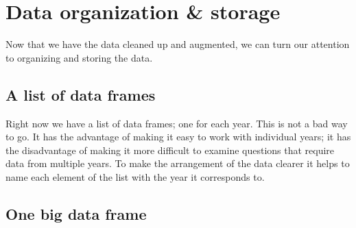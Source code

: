 \documentclass[
]{book}
\newenvironment{Shaded}{\begin{snugshade}}{\end{snugshade}}
\newcommand{\CommentTok}[1]{\textcolor[rgb]{0.56,0.35,0.01}{\textit{#1}}}
\newcommand{\DataTypeTok}[1]{\textcolor[rgb]{0.13,0.29,0.53}{#1}}
\newcommand{\KeywordTok}[1]{\textcolor[rgb]{0.13,0.29,0.53}{\textbf{#1}}}
\newcommand{\NormalTok}[1]{#1}
\newcommand{\OperatorTok}[1]{\textcolor[rgb]{0.81,0.36,0.00}{\textbf{#1}}}
\newcommand{\StringTok}[1]{\textcolor[rgb]{0.31,0.60,0.02}{#1}}
\begin{document}
\hypertarget{data-organization-storage}{%
\section{Data organization \& storage}\label{data-organization-storage}}

Now that we have the data cleaned up and augmented, we can turn our attention to organizing and storing the data.

\hypertarget{a-list-of-data-frames}{%
\subsection{A list of data frames}\label{a-list-of-data-frames}}

Right now we have a list of data frames; one for each year. This is not a bad way to go. It has the advantage of making it easy to work with individual years; it has the disadvantage of making it more difficult to examine questions that require data from multiple years. To make the arrangement of the data clearer it helps to name each element of the list with the year it corresponds to.

\begin{Shaded}
\end{Shaded}

\hypertarget{one-big-data-frame}{%
\subsection{One big data frame}\label{one-big-data-frame}}
\end{document}

